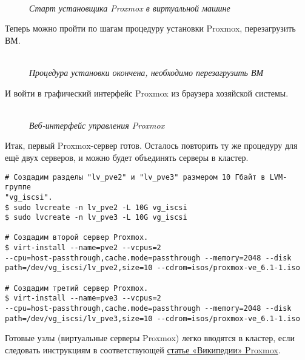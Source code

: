 \documentclass[14pt, a4paper]{article}
\begin{document}
\begin{figure}[h]
    \centering
    \\
    \small\textit{Старт установщика Proxmox в виртуальной машине}  
    \label{framework} 
\end{figure}

Теперь можно пройти по шагам процедуру установки Proxmox, перезагрузить ВМ.

\begin{figure}[h]
    \centering
    \\
    \small\textit{Процедура установки окончена, необходимо перезагрузить ВМ}  
    \label{framework} 
\end{figure}

И войти в графический интерфейс Proxmox из браузера хозяйской системы.

\begin{figure}[h]
    \centering
    \\
    \small\textit{Веб-интерфейс управления Proxmox}  
    \label{framework} 
\end{figure}

Итак, первый Proxmox-сервер готов. Осталось повторить ту же процедуру для ещё двух серверов, и
можно будет объединять серверы в кластер.

\begin{lstlisting}
# Создадим разделы "lv_pve2" и "lv_pve3" размером 10 Гбайт в LVM-группе
"vg_iscsi".
$ sudo lvcreate -n lv_pve2 -L 10G vg_iscsi
$ sudo lvcreate -n lv_pve3 -L 10G vg_iscsi

# Создадим второй сервер Proxmox.
$ virt-install --name=pve2 --vcpus=2
--cpu=host-passthrough,cache.mode=passthrough --memory=2048 --disk
path=/dev/vg_iscsi/lv_pve2,size=10 --cdrom=isos/proxmox-ve_6.1-1.iso

# Создадим третий сервер Proxmox.
$ virt-install --name=pve3 --vcpus=2
--cpu=host-passthrough,cache.mode=passthrough --memory=2048 --disk
path=/dev/vg_iscsi/lv_pve3,size=10 --cdrom=isos/proxmox-ve_6.1-1.iso
\end{lstlisting}

Готовые узлы (виртуальные серверы Proxmox) легко вводятся в кластер, если следовать инструкциям
в соответствующей \href{https://pve.proxmox.com/wiki/Cluster_Manager#pvecm_join_node_to_cluster}{статье «Википедии» Proxmox}.\\
\end{document}
